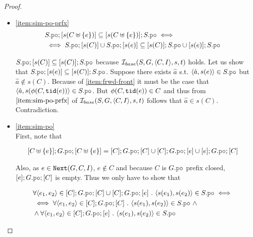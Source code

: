 \documentclass[12pt]{article}
\begin{document}
\begin{proof}
\begin{itemize}
  \item \ref{item:sim-po-prfx} \\

    \begin{equation*}
      \begin{split}
        &     S.\lPO;[s(C \uplus \{e\})] \subseteq [s(C \uplus \{e\})];S.\lPO \iff \\
        &\iff S.\lPO;[s(C)] \cup S.\lPO;[s(e)] \subseteq [s(C)];S.\lPO \cup [s(e)];S.\lPO
      \end{split}
    \end{equation*}

    $S.\lPO;[s(C)] \subseteq [s(C)];S.\lPO$ because $\mathcal{I}_{base}(S, G, \langle C, I \rangle, s, t)$ holds.
    Let us show that $S.\lPO;[s(e)] \subseteq [s(C)];S.\lPO$.
    Suppose there exists $\hat{a}$ s.t. $\tup{\hat{a}, s(e)} \in S.\lPO$ but
    $\hat{a} \not\in s(C)$.
    Because of \ref{item:frwd-front}
    it must be the case that $\tup{\hat{a}, s(\front(C, \lTID(e))} \in S.\lPO$.
    But $\phi(C, {\mathtt{tid}}(e)) \in C$ and thus from $\ref{item:sim-po-prfx}$
    of $\mathcal{I}_{base}(S, G, \langle C, I \rangle, s, t)$ follows that $\hat{a} \in s(C)$. Contradiction.

  \item \ref{item:sim-po} \\
    First, note that 
    
    \begin{equation*}
      \begin{split}
        [C \uplus \{e\}];G.\lPO;[C \uplus \{e\}] =
          [C];G.\lPO;[C] \cup [C];G.\lPO;[e] \cup [e];G.\lPO;[C]
      \end{split}
    \end{equation*}

    Also, as $e \in {\mathtt{Next}}(G, C, I)$, $e \not\in C$ and
    because $C$ is $G.\lPO$ prefix closed, $[e];G.\lPO;[C]$ is empty.
    Thus we only have to show that

    \begin{equation*}
      \begin{split}
        & \forall{\tup{e_1, e_2} \in [C];G.\lPO;[C] \cup [C];G.\lPO;[e]} ~.~
            \tup{s(e_1), s(e_2)} \in S.\lPO \iff \\
        & \iff
          \forall{\tup{e_1, e_2} \in [C];G.\lPO;[C]} ~.~ \tup{s(e_1), s(e_2)} \in S.\lPO ~ \wedge \\
        & \wedge
          \forall{\tup{e_1, e_2} \in [C];G.\lPO;[e]} ~.~ \tup{s(e_1), s(e_2)} \in S.\lPO
      \end{split}
    \end{equation*}


\end{itemize}
\end{proof}
\end{document}
